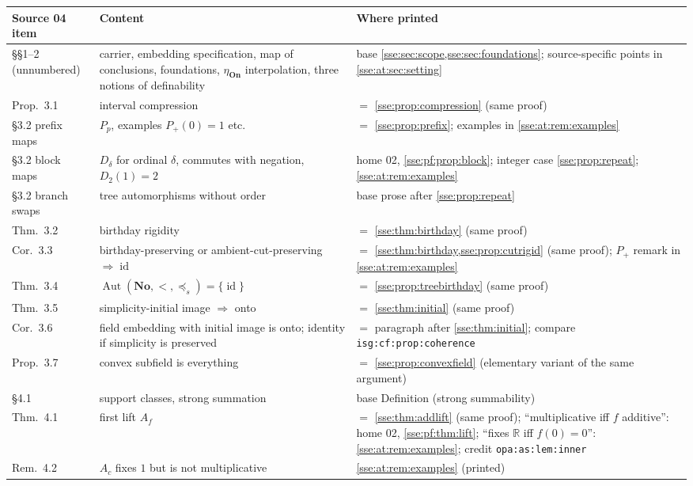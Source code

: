 \documentclass[11pt,a4paper]{article}
\numberwithin{equation}{section}
\theoremstyle{plain}
\theoremstyle{definition}
\theoremstyle{remark}
\newcommand{\No}{\mathbf{No}}
\newcommand{\On}{\mathbf{On}}
\newcommand{\R}{\mathbb{R}}
\newcommand{\id}{\operatorname{id}}
\newcommand{\pref}{\preccurlyeq_s}
\newcommand{\lbl}[1]{\nolinkurl{#1}}%
\begin{document}
{\small
\begin{longtable}{P{30mm}P{50mm}P{70mm}}
\toprule
Source 04 item & Content & Where printed \\
\midrule
\endhead
\S\S1--2 (unnumbered) & carrier, embedding specification, map of conclusions, foundations, $\eta_{\On}$ interpolation, three notions of definability & base \cref{sse:sec:scope,sse:sec:foundations}; source-specific points in \cref{sse:at:sec:setting} \\
Prop.~3.1 & interval compression & $=$ \cref{sse:prop:compression} (same proof) \\
\S3.2 prefix maps & $P_p$, examples $P_+(0)=1$ etc. & $=$ \cref{sse:prop:prefix}; examples in \cref{sse:at:rem:examples} \\
\S3.2 block maps & $D_\delta$ for ordinal $\delta$, commutes with negation, $D_2(1)=2$ & home 02, \cref{sse:pf:prop:block}; integer case \cref{sse:prop:repeat}; \cref{sse:at:rem:examples} \\
\S3.2 branch swaps & tree automorphisms without order & base prose after \cref{sse:prop:repeat} \\
Thm.~3.2 & birthday rigidity & $=$ \cref{sse:thm:birthday} (same proof) \\
Cor.~3.3 & birthday-preserving or ambient-cut-preserving $\Rightarrow\id$ & $=$ \cref{sse:thm:birthday,sse:prop:cutrigid} (same proof); $P_+$ remark in \cref{sse:at:rem:examples} \\
Thm.~3.4 & $\operatorname{Aut}(\No,<,\pref)=\{\id\}$ & $=$ \cref{sse:prop:treebirthday} (same proof) \\
Thm.~3.5 & simplicity-initial image $\Rightarrow$ onto & $=$ \cref{sse:thm:initial} (same proof) \\
Cor.~3.6 & field embedding with initial image is onto; identity if simplicity is preserved & $=$ paragraph after \cref{sse:thm:initial}; compare \lbl{isg:cf:prop:coherence} \\
Prop.~3.7 & convex subfield is everything & $=$ \cref{sse:prop:convexfield} (elementary variant of the same argument) \\
\S4.1 & support classes, strong summation & base Definition (strong summability) \\
Thm.~4.1 & first lift $A_f$ & $=$ \cref{sse:thm:addlift} (same proof); ``multiplicative iff $f$ additive'': home 02, \cref{sse:pf:thm:lift}; ``fixes $\R$ iff $f(0)=0$'': \cref{sse:at:rem:examples}; credit \lbl{opa:as:lem:inner} \\
Rem.~4.2 & $A_c$ fixes $1$ but is not multiplicative & \cref{sse:at:rem:examples} (printed) \\

\end{longtable}}
\end{document}
